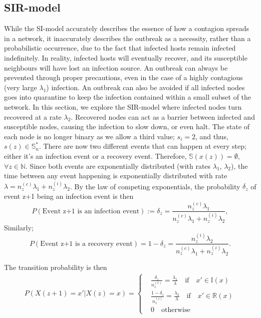 \documentclass[12pt]{article} %
\numberwithin{equation}{section}
\begin{document}
\subsection{SIR-model}\label{SIR-model-section}
While the SI-model accurately describes the essence of how a contagion spreads in a network, it inaccurately describes the outbreak as a necessity, rather than a probabilistic occurrence, due to the fact that infected hosts remain infected indefinitely. In reality, infected hosts will eventually recover, and its susceptible neighbours will have lost an infection source. An outbreak can always be prevented through proper precautions, even in the case of a highly contagious (very large $\lambda_1$) infection. An outbreak can also be avoided if all infected nodes goes into quarantine to keep the infection contained within a small subset of the network.
In this section, we explore the SIR-model where infected nodes turn recovered at a rate $\lambda_2$. Recovered nodes can act as a barrier between infected and susceptible nodes, causing the infection to slow down, or even halt. The state of each node is no longer binary as we allow a third value; $s_i = 2$, and thus, $s(z) \in \mathbb{S}_n^*$. There are now two different events that can happen at every step; either it's an infection event or a recovery event. Therefore, $\mathbb{S}(x(z)) = \emptyset$, $\forall z\in \mathbb{N}$. Since both events are exponentially distributed (with rates $\lambda_1$, $\lambda_2$), the time between any event happening is exponentially distributed with rate $\lambda = n_z^{(c)}\lambda_1+n_z^{(i)}\lambda_2$. By the law of competing exponentials, the probability $\delta_z$ of event z+1 being an infection event is then
\begin{equation}\label{SIR-P12}
    P(\text{Event z+1 is an infection event}) := \delta_z = \frac{n^{(c)}_z\lambda_1}{n^{(c)}_z\lambda_1+n^{(i)}_z\lambda_2},
\end{equation}
Similarly;
\begin{equation}
    P(\text{Event z+1 is a recovery event}) = 1-\delta_z =\frac{n^{(i)}_z\lambda_2}{n^{(c)}_z\lambda_1+n^{(i)}_z\lambda_2}.
\end{equation}

The transition probability is then
\begin{equation} \label{firstPSIR}
\begin{split}
P(X(z+1) = x' |X(z)= x) =
\begin{cases}
& \frac{\delta_z}{n_z^{(c)}} = \frac{\lambda_1}{\lambda}  \quad \text{if} \quad x' \in \mathbb{I}(x) \\
& \frac{1-\delta_z}{n_z^{(i)}}  =\frac{\lambda_2}{\lambda}\quad \text{if} \quad x' \in \mathbb{R}(x) \\
& 0 \quad \text{otherwise}
\end{cases}
\end{split}
\end{equation}
\end{document}
